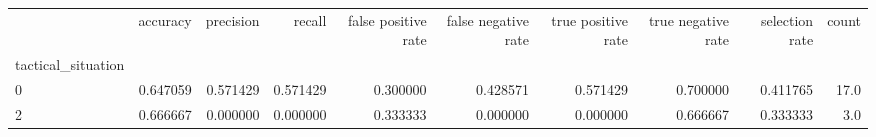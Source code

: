 \begin{tabular}{lrrrrrrrrr}
\toprule
{} &  accuracy &  precision &    recall &  false positive rate &  false negative rate &  true positive rate &  true negative rate &  selection rate &  count \\
tactical\_situation &           &            &           &                      &                      &                     &                     &                 &        \\
\midrule
0                  &  0.647059 &   0.571429 &  0.571429 &             0.300000 &             0.428571 &            0.571429 &            0.700000 &        0.411765 &   17.0 \\
2                  &  0.666667 &   0.000000 &  0.000000 &             0.333333 &             0.000000 &            0.000000 &            0.666667 &        0.333333 &    3.0 \\
\bottomrule
\end{tabular}

